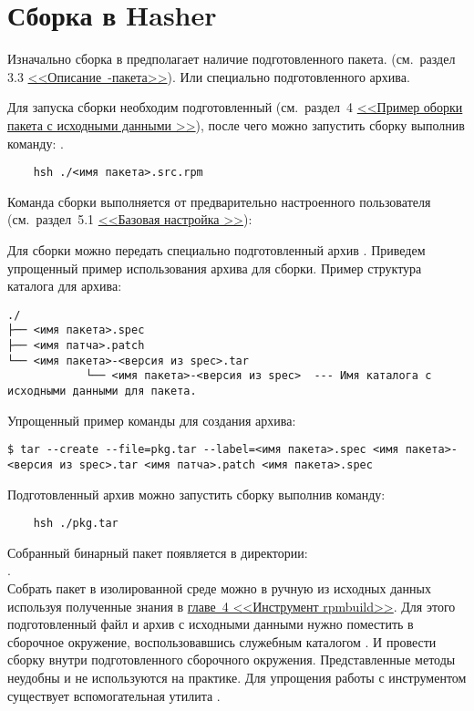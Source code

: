 \section{Сборка в Hasher}
Изначально сборка в  предполагает наличие подготовленного  пакета.
(см.~раздел 3.3 \hyperlink{rpm-pack-desc}{\mbox{<<Описание -пакета>>}}).
Или специально подготовленного  архива.

Для запуска сборки необходим подготовленный  (см.~раздел~4
\hyperlink{rpmbuild-exampl-src}{<<Пример оборки пакета с исходными данными >>}),
после чего можно запустить сборку выполнив команду:
.
\begin{verbatim}
    hsh ./<имя пакета>.src.rpm
\end{verbatim}
Команда сборки выполняется от предварительно настроенного пользователя
(см.~раздел~5.1 \hyperlink{5.1}{<<Базовая настройка >>}):

Для сборки можно передать специально подготовленный архив . Приведем упрощенный пример
использования архива для сборки.
Пример структура каталога для архива:
\begin{verbatim}
./
├── <имя пакета>.spec
├── <имя патча>.patch
└── <имя пакета>-<версия из spec>.tar
			└── <имя пакета>-<версия из spec>  --- Имя каталога с исходными данными для пакета.
\end{verbatim}

Упрощенный пример команды для создания  архива:
\begin{verbatim}
$ tar --create --file=pkg.tar --label=<имя пакета>.spec <имя пакета>-<версия из spec>.tar <имя патча>.patch <имя пакета>.spec
\end{verbatim}

Подготовленный архив можно запустить сборку выполнив команду:
\begin{verbatim}
    hsh ./pkg.tar
\end{verbatim}

Собранный бинарный пакет появляется в директории:\\ .\\

Собрать пакет в изолированной среде можно в ручную из исходных данных используя полученные знания
в \hyperlink{rpmbuild}{главе~4 <<Инструмент rpmbuild>>}. Для этого подготовленный файл  и архив
с исходными данными нужно поместить в сборочное окружение, воспользовавшись служебным каталогом
. И провести сборку  внутри подготовленного сборочного окружения.
Представленные методы неудобны и не используются на практике. Для упрощения работы с инструментом
существует вспомогательная утилита .

